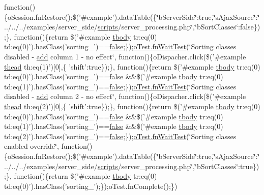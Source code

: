 \begin{DoxyCompactItemize}
function()\{o\+Session.\+fn\+Restore();\$('\#example').data\+Table(\{\char`\"{}b\+Server\+Side\char`\"{}\+:true,\char`\"{}s\+Ajax\+Source\char`\"{}\+:\char`\"{}../../../examples/server\+\_\+side/\hyperlink{tinymce_8jquery_8dev_8js_a09066d4d580eeec222f858d588b4cdef}{scripts}/server\+\_\+processing.\+php\char`\"{},\char`\"{}b\+Sort\+Classes\char`\"{}\+:false\});\}, function()\{return \$('\#example \hyperlink{core_8constructor_8js_a99b0542c7c50fe8757c55bf9dac5f3be}{tbody} tr\+:eq(0) td\+:eq(0)').has\+Class('sorting\+\_')==\hyperlink{validate_8js_a5df37b7f02e5cdc7d9412b7f872b8e01}{false};\});\hyperlink{onhold_24__server-side_2__zero__config_8js_ab25c4d596771c0133cdc45178ce72c3d}{o\+Test.\+fn\+Wait\+Test}(\char`\"{}Sorting classes disabled -\/ \hyperlink{theme_8min_8js_a1833965973c7833716346fa64230bb38}{add} column 1 -\/ no effect\char`\"{}, function()\{o\+Dispacher.\+click(\$('\#example \hyperlink{core_8constructor_8js_a856be760b6816c9591ce69f0a2b43693}{thead} th\+:eq(1)')\mbox{[}0\mbox{]},\{ 'shift'\+:true\});\}, function()\{return \$('\#example \hyperlink{core_8constructor_8js_a99b0542c7c50fe8757c55bf9dac5f3be}{tbody} tr\+:eq(0) td\+:eq(0)').has\+Class('sorting\+\_')==\hyperlink{validate_8js_a5df37b7f02e5cdc7d9412b7f872b8e01}{false} \&\&\$('\#example \hyperlink{core_8constructor_8js_a99b0542c7c50fe8757c55bf9dac5f3be}{tbody} tr\+:eq(0) td\+:eq(1)').has\+Class('sorting\+\_')==\hyperlink{validate_8js_a5df37b7f02e5cdc7d9412b7f872b8e01}{false};\});\hyperlink{onhold_24__server-side_2__zero__config_8js_ab25c4d596771c0133cdc45178ce72c3d}{o\+Test.\+fn\+Wait\+Test}(\char`\"{}Sorting classes disabled -\/ \hyperlink{theme_8min_8js_a1833965973c7833716346fa64230bb38}{add} column 2 -\/ no effect\char`\"{}, function()\{o\+Dispacher.\+click(\$('\#example \hyperlink{core_8constructor_8js_a856be760b6816c9591ce69f0a2b43693}{thead} th\+:eq(2)')\mbox{[}0\mbox{]},\{ 'shift'\+:true\});\}, function()\{return \$('\#example \hyperlink{core_8constructor_8js_a99b0542c7c50fe8757c55bf9dac5f3be}{tbody} tr\+:eq(0) td\+:eq(0)').has\+Class('sorting\+\_')==\hyperlink{validate_8js_a5df37b7f02e5cdc7d9412b7f872b8e01}{false} \&\&\$('\#example \hyperlink{core_8constructor_8js_a99b0542c7c50fe8757c55bf9dac5f3be}{tbody} tr\+:eq(0) td\+:eq(1)').has\+Class('sorting\+\_')==\hyperlink{validate_8js_a5df37b7f02e5cdc7d9412b7f872b8e01}{false} \&\&\$('\#example \hyperlink{core_8constructor_8js_a99b0542c7c50fe8757c55bf9dac5f3be}{tbody} tr\+:eq(0) td\+:eq(2)').has\+Class('sorting\+\_')==\hyperlink{validate_8js_a5df37b7f02e5cdc7d9412b7f872b8e01}{false};\});\hyperlink{onhold_24__server-side_2__zero__config_8js_ab25c4d596771c0133cdc45178ce72c3d}{o\+Test.\+fn\+Wait\+Test}(\char`\"{}Sorting classes enabled override\char`\"{}, function()\{o\+Session.\+fn\+Restore();\$('\#example').data\+Table(\{\char`\"{}b\+Server\+Side\char`\"{}\+:true,\char`\"{}s\+Ajax\+Source\char`\"{}\+:\char`\"{}../../../examples/server\+\_\+side/\hyperlink{tinymce_8jquery_8dev_8js_a09066d4d580eeec222f858d588b4cdef}{scripts}/server\+\_\+processing.\+php\char`\"{},\char`\"{}b\+Sort\+Classes\char`\"{}\+:true\});\}, function()\{return \$('\#example \hyperlink{core_8constructor_8js_a99b0542c7c50fe8757c55bf9dac5f3be}{tbody} tr\+:eq(0) td\+:eq(0)').has\+Class('sorting\+\_');\});o\+Test.\+fn\+Complete();\})

\end{DoxyCompactItemize}
